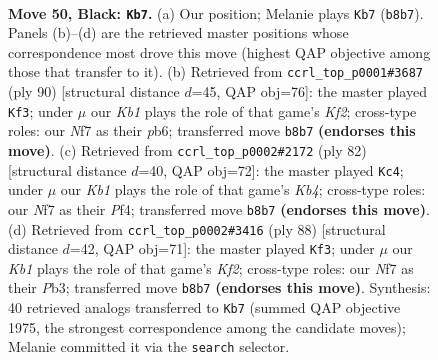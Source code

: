 \documentclass[11pt]{article}
\begin{document}
\clearpage

\begin{figure}[p]\centering
\begin{subfigure}{0.46\textwidth}\centering
\resizebox{\linewidth}{!}{%
\newchessgame
\chessboard[
  setfen={1k2Q3/p1p2np1/1p4p1/2p2q2/8/2P5/1P6/K7 b - - 1 50},
  showmover=false,
  pgfstyle=straightmove, color=movearrow, markmove={b8-b7}
]}
\caption{}
\end{subfigure}\hfill
\begin{subfigure}{0.46\textwidth}\centering
\resizebox{\linewidth}{!}{%
\newchessgame
\chessboard[
  setfen={8/6pk/1p5p/3Qp3/4P3/1P2P1P1/2q2K1P/8 w - - 3 46},
  showmover=false,
  pgfstyle=straightmove, color=movearrow, markmove={f2-f3}
]}
\caption{}
\end{subfigure}
\\[4pt]
\begin{subfigure}{0.46\textwidth}\centering
\resizebox{\linewidth}{!}{%
\newchessgame
\chessboard[
  setfen={6k1/1q3pp1/8/4P2p/1K3P2/P3Q1P1/8/8 w - - 12 42},
  showmover=false,
  pgfstyle=straightmove, color=movearrow, markmove={b4-c4}
]}
\caption{}
\end{subfigure}\hfill
\begin{subfigure}{0.46\textwidth}\centering
\resizebox{\linewidth}{!}{%
\newchessgame
\chessboard[
  setfen={8/6pk/5p1p/8/1Q3P2/1P2P1P1/2q2K2/8 w - - 5 45},
  showmover=false,
  pgfstyle=straightmove, color=movearrow, markmove={f2-f3}
]}
\caption{}
\end{subfigure}
\caption{\textbf{Move 50, Black: \texttt{Kb7}.} (a) Our position; Melanie plays \texttt{Kb7} (\texttt{b8b7}). Panels (b)--(d) are the retrieved master positions whose correspondence most drove this move (highest QAP objective among those that transfer to it). (b) Retrieved from \texttt{ccrl\_top\_p0001\#3687} (ply 90) [structural distance $d$=45, QAP obj=76]: the master played \texttt{Kf3}; under $\mu$ our \emph{Kb1} plays the role of that game's \emph{Kf2}; cross-type roles: our \emph{N}f7 as their \emph{p}b6; transferred move \texttt{b8b7} \textbf{(endorses this move)}. (c) Retrieved from \texttt{ccrl\_top\_p0002\#2172} (ply 82) [structural distance $d$=40, QAP obj=72]: the master played \texttt{Kc4}; under $\mu$ our \emph{Kb1} plays the role of that game's \emph{Kb4}; cross-type roles: our \emph{N}f7 as their \emph{P}f4; transferred move \texttt{b8b7} \textbf{(endorses this move)}. (d) Retrieved from \texttt{ccrl\_top\_p0002\#3416} (ply 88) [structural distance $d$=42, QAP obj=71]: the master played \texttt{Kf3}; under $\mu$ our \emph{Kb1} plays the role of that game's \emph{Kf2}; cross-type roles: our \emph{N}f7 as their \emph{P}b3; transferred move \texttt{b8b7} \textbf{(endorses this move)}. Synthesis: 40 retrieved analogs transferred to \texttt{Kb7} (summed QAP objective 1975, the strongest correspondence among the candidate moves); Melanie committed it via the \texttt{search} selector.}
\label{fig:thought-m99}
\end{figure}
\end{document}
